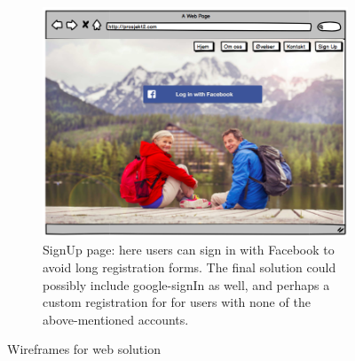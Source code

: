 \begin{figure}[H]
\begin{subfigure}{.5\textwidth}
  \includegraphics[width=.8\linewidth]{wireframes/web/SignUp}
  \caption{SignUp page: here users can sign in with Facebook to avoid long registration forms. The final solution could possibly include google-signIn as well, and perhaps a custom registration for  for users with none of the above-mentioned accounts.}
  \label{fig:videoSignUp}
\end{subfigure}
\caption{Wireframes for web solution}
\end{figure}

    

